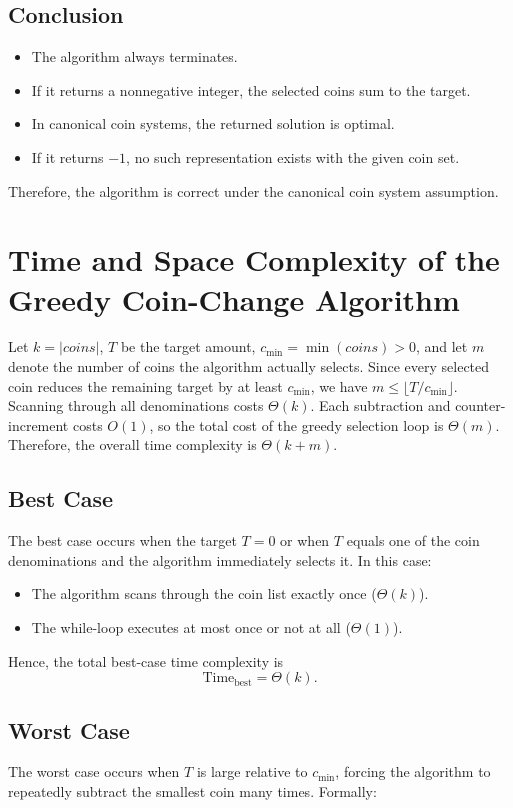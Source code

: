 \documentclass[12pt,a4paper]{report}
\begin{document}
\subsection{Conclusion}
\begin{itemize}
    \item The algorithm always terminates.
    \item If it returns a nonnegative integer, the selected coins sum to the target.
    \item In canonical coin systems, the returned solution is optimal.
    \item If it returns $-1$, no such representation exists with the given coin set.
\end{itemize}
Therefore, the algorithm is correct under the canonical coin system assumption.

\section{Time and Space Complexity of the Greedy Coin-Change Algorithm}

Let \(k = |coins|\), \(T\) be the target amount, \(c_{\min} = \min(coins) > 0\), and let \(m\) denote the number of coins the algorithm actually selects. Since every selected coin reduces the remaining target by at least \(c_{\min}\), we have \(m \le \lfloor T / c_{\min} \rfloor\). Scanning through all denominations costs \(\Theta(k)\). 
Each subtraction and counter-increment costs \(O(1)\), so the total cost of the greedy selection loop is \(\Theta(m)\). Therefore, the overall time complexity is \(\Theta(k + m)\).

\subsection{Best Case}
The best case occurs when the target \(T = 0\) or when \(T\) equals one of the coin denominations and the algorithm immediately selects it. In this case:

\begin{itemize}
    \item The algorithm scans through the coin list exactly once (\(\Theta(k)\)).
    \item The while-loop executes at most once or not at all (\(\Theta(1)\)).
\end{itemize}

Hence, the total best-case time complexity is
\[
\text{Time}_{\text{best}} = \Theta(k).
\]

\subsection{Worst Case}
The worst case occurs when \(T\) is large relative to \(c_{\min}\), forcing the algorithm to repeatedly subtract the smallest coin many times. Formally:
\end{document}
